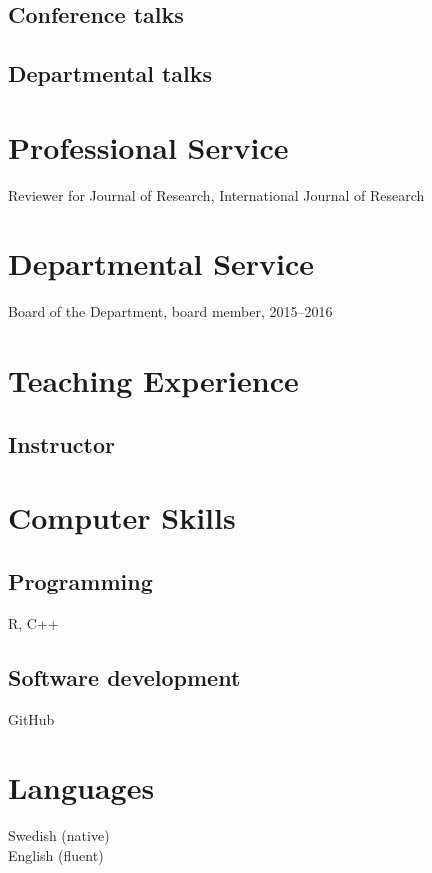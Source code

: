 \documentclass{karencv}
\begin{document}
\subsection{Conference talks}

\subsection{Departmental talks}

\section{Professional Service}
Reviewer for Journal of Research, International Journal of Research

\section{Departmental Service}
Board of the Department, board member, 2015--2016

\section{Teaching Experience}

\subsection{Instructor}

\section{Computer Skills}
\subsection{Programming}
R, C++

\subsection{Software development}
GitHub

\section{Languages}
Swedish (native)\\
English (fluent)
\end{document}
